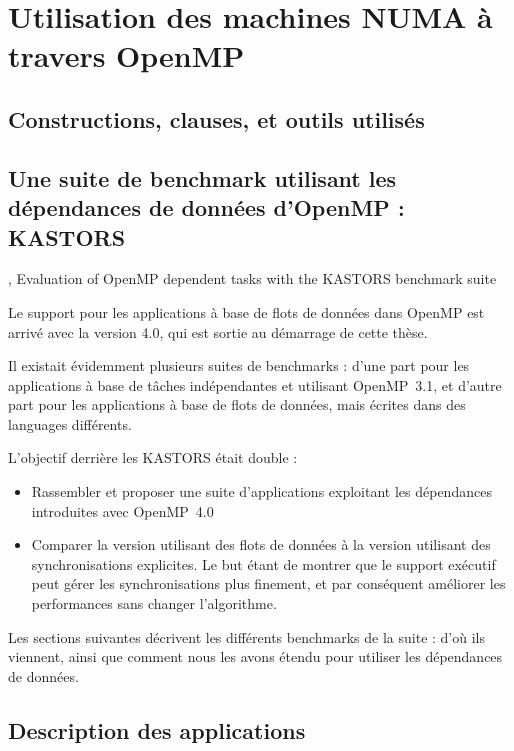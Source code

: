 \section{Utilisation des machines NUMA à travers OpenMP}

\subsection{Constructions, clauses, et outils utilisés}


\subsection{Une suite de benchmark utilisant les dépendances de données d'OpenMP : KASTORS}

\begin{todo}
\cite{Virouleau2014}, Evaluation of OpenMP dependent tasks with the KASTORS benchmark suite
\end{todo}
Le support pour les applications à base de flots de données dans OpenMP est arrivé avec la version 4.0, qui est sortie au démarrage de cette thèse.

Il existait évidemment plusieurs suites de benchmarks : d'une part pour les applications à base de tâches indépendantes et utilisant OpenMP~3.1, et d'autre part pour les applications à base de flots de données, mais écrites dans des languages différents.

L'objectif derrière les KASTORS était double :
\begin{itemize}
    \item Rassembler et proposer une suite d'applications exploitant les dépendances introduites avec OpenMP~4.0
    \item Comparer la version utilisant des flots de données à la version utilisant des synchronisations explicites. Le but étant de montrer que le support exécutif peut gérer les synchronisations plus finement, et par conséquent améliorer les performances sans changer l'algorithme.
\end{itemize}

Les sections suivantes décrivent les différents benchmarks de la suite : d'où ils viennent, ainsi que comment nous les avons étendu pour utiliser les dépendances de données.

\subsection{Description des applications}

